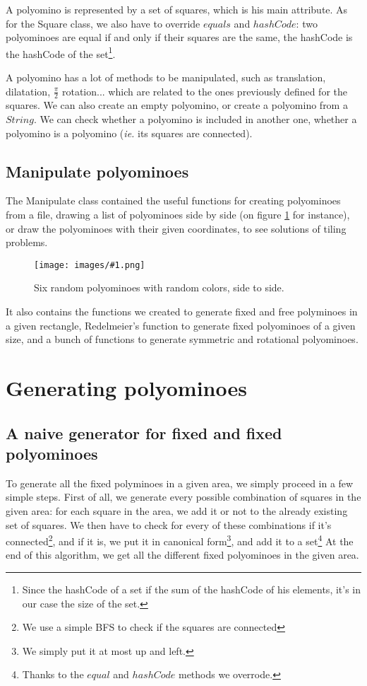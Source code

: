 \documentclass[12pt]{article}
\newcommand{\foreign}{\textit}
\newcommand{\illustration}[2]{
	\begin{figure}[]
	\begin{center}
	\texttt{[image: images/\#1.png]}
	\caption{#2}
	\label{fig:#1}
	\end{center}
	\end{figure}
}
\begin{document}
A polyomino is represented by a set of squares, which is his main attribute.
As for the Square class, we also have to override $equals$ and $hashCode$: two polyominoes are equal if and only if their squares are the same, the hashCode is the hashCode of the set\footnote{Since the hashCode of a set if the sum of the hashCode of his elements, it's in our case the size of the set.}.

A polyomino has a lot of methods to be manipulated, such as translation, dilatation, $\frac{\pi}{2}$ rotation... which are related to the ones previously defined for the squares.
We can also create an empty polyomino, or create a polyomino from a $String$.
We can check whether a polyomino is included in another one, whether a polyomino is a polyomino (\foreign{ie.} its squares are connected).

\subsection{Manipulate polyominoes}

The Manipulate class contained the useful functions for creating polyominoes from a file, drawing a list of polyominoes side by side (on figure \ref{fig:INF421} for instance), or draw the polyominoes with their given coordinates, to see solutions of tiling problems.

\illustration{INF421}{Six random polyominoes with random colors, side to side.}

It also contains the functions we created to generate fixed and free polyminoes in a given rectangle, Redelmeier's function to generate fixed polyominoes of a given size, and a bunch of functions to generate symmetric and rotational polyominoes.



\section{Generating polyominoes}

\subsection{A naive generator for fixed and fixed polyominoes}

To generate all the fixed polyminoes in a given area, we simply proceed in a few simple steps.
First of all, we generate every possible combination of squares in the given area: for each square in the area, we add it or not to the already existing set of squares.
We then have to check for every of these combinations if it's connected\footnote{We use a simple BFS to check if the squares are connected}, and if it is, we put it in canonical form\footnote{We simply put it at most up and left.}, and add it to a set\footnote{Thanks to the $equal$ and $hashCode$ methods we overrode.}
At the end of this algorithm, we get all the different fixed polyominoes in the given area.
\end{document}
